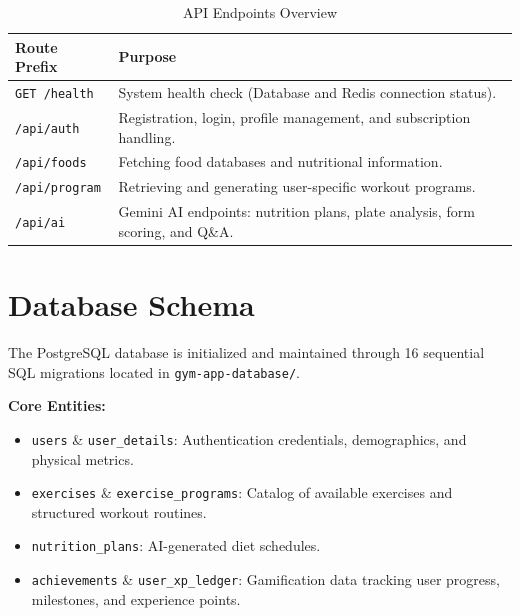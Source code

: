 \documentclass[12pt,a4paper]{article}
\begin{document}
\begin{table}[H]
\centering
\begin{tabular}{@{}ll@{}}
\toprule
\textbf{Route Prefix} & \textbf{Purpose} \\ \midrule
\texttt{GET /health} & System health check (Database and Redis connection status). \\
\texttt{/api/auth} & Registration, login, profile management, and subscription handling. \\
\texttt{/api/foods} & Fetching food databases and nutritional information. \\
\texttt{/api/program} & Retrieving and generating user-specific workout programs. \\
\texttt{/api/ai} & Gemini AI endpoints: nutrition plans, plate analysis, form scoring, and Q\&A. \\ \bottomrule
\end{tabular}
\caption{API Endpoints Overview}
\end{table}

\section{Database Schema}
The PostgreSQL database is initialized and maintained through 16 sequential SQL migrations located in \texttt{gym-app-database/}. 

\textbf{Core Entities:}
\begin{itemize}
    \item \texttt{users} \& \texttt{user\_details}: Authentication credentials, demographics, and physical metrics.
    \item \texttt{exercises} \& \texttt{exercise\_programs}: Catalog of available exercises and structured workout routines.
    \item \texttt{nutrition\_plans}: AI-generated diet schedules.
    \item \texttt{achievements} \& \texttt{user\_xp\_ledger}: Gamification data tracking user progress, milestones, and experience points.
\end{itemize}
\end{document}
